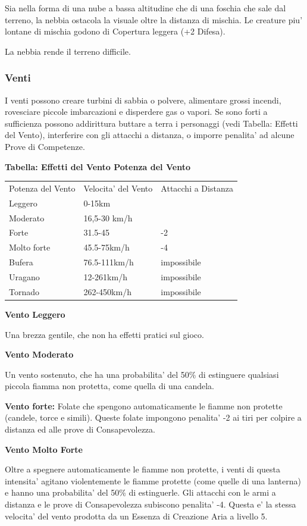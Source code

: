 \documentclass[a4paper,11pt,twoside,openany]{dndbook}
\begin{document}
{Sia nella forma di una nube a bassa altitudine che di una foschia che sale dal terreno, la nebbia ostacola la visuale oltre la distanza di mischia. Le creature piu' lontane di mischia godono di Copertura leggera (+2 Difesa).

La nebbia rende il terreno difficile.


\subsubsection{Venti}

\label{venti}

I venti possono creare turbini di sabbia o polvere, alimentare grossi incendi, rovesciare piccole imbarcazioni e disperdere gas o vapori. Se sono forti a sufficienza possono addirittura buttare a terra i personaggi (vedi Tabella: Effetti del Vento), interferire con gli attacchi a distanza, o imporre penalita' ad alcune Prove di Competenze.

\textbf{Tabella: Effetti del Vento Potenza del Vento}

\begin{tabular}[c]{@{}lll@{}}
\toprule 
Potenza del Vento & Velocita' del Vento & Attacchi a Distanza\\
Leggero & 0-15km \tabularnewline
Moderato & 16,5-30 km/h  \tabularnewline
Forte & 31.5-45 & -2 \tabularnewline
Molto forte & 45.5-75km/h & -4 \tabularnewline
Bufera & 76.5-111km/h & impossibile  \tabularnewline
Uragano & 12-261km/h & impossibile \tabularnewline
Tornado & 262-450km/h & impossibile\tabularnewline
\bottomrule
\end{tabular}

\bigskip

\textbf{Vento Leggero}

Una brezza gentile, che non ha effetti pratici sul gioco.

\textbf{Vento Moderato}

Un vento sostenuto, che ha una probabilita' del 50\% di estinguere qualsiasi piccola fiamma non protetta, come quella di una candela.

\textbf{Vento forte:} Folate che spengono automaticamente le fiamme non protette (candele, torce e simili). Queste folate impongono penalita' -2 ai tiri per colpire a distanza ed alle prove di Consapevolezza.

\textbf{Vento Molto Forte}

Oltre a spegnere automaticamente le fiamme non protette, i venti di questa intensita' agitano violentemente le fiamme protette (come quelle di una lanterna) e hanno una probabilita' del 50\% di estinguerle. Gli attacchi con le armi a distanza e le prove di Consapevolezza subiscono penalita' -4. Questa e' la stessa velocita' del vento prodotta da un Essenza di Creazione Aria a livello 5.

}
\end{document}
